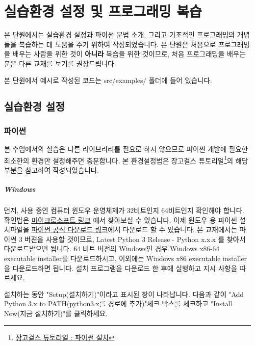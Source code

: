 \chapter{실습환경 설정 및 프로그래밍 복습} 

본 단원에서는 실습환경 설정과 파이썬 문법 소개, 그리고 기초적인 프로그래밍의 개념들을 복습하는 데 도움을 주기 위하여 작성되었습니다. 본 단원은 처음으로 프로그래밍을 배우는 사람을 위한 것이 \textbf{아니라} 복습을 위한 것이므로, 처음 프로그래밍을 배우는 분은 다른 교재를 보기를 권장드립니다. 

본 단원에서 예시로 작성된 코드는 src/examples/ 폴더에 들어 있습니다. 

\section{실습환경 설정} 

\subsection{파이썬} 
본 수업에서의 실습은 다른 라이브러리를 필요로 하지 않으므로 파이썬 개발에 필요한 최소한의 환경만 설정해주면 충분합니다. 본 환경설정법은 장고걸스 튜토리얼\footnote{\href{https://tutorial.djangogirls.org/ko/python\_installation/}{장고걸스 튜토리얼 : 파이썬 설치}}의 해당 부분을 참고하여 작성되었습니다. 

\paragraph{Windows} 

먼저, 사용 중인 컴퓨터 윈도우 운영체제가 32비트인지 64비트인지 확인해야 합니다. 확인법은 \href{https://support.microsoft.com/ko-kr/help/13443/windows-which-operating-system}{마이크로소프트 링크} 에서 찾아보실 수 있습니다. 이제 윈도우 용 파이썬 설치파일을 \href{https://www.python.org/downloads/windows/}{파이썬 공식 다운로드 링크}에서 다운로드 할 수 있습니다. 본 교재에서는 파이썬 3 버젼을 사용할 것이므로, Latest Python 3 Release - Python x.x.x 를 찾아서 다운로드받으면 됩니다. 64 비트 버전의 Windows인 경우 Windows x86-64 executable installer를 다운로드하시고, 이외에는 Windows x86 executable installer을 다운로드하면 됩니다. 설치 프로그램을 다운로드 한 후에 실행하고 지시 사항을 따르세요. 

설치하는 동안 "Setup(설치하기)"이라고 표시된 창이 나타납니다. 다음과 같이 "Add Python 3.x to PATH(python3.x를 경로에 추가)"체크 박스를 체크하고 "Install Now(지금 설치하기)"를 클릭하세요.

